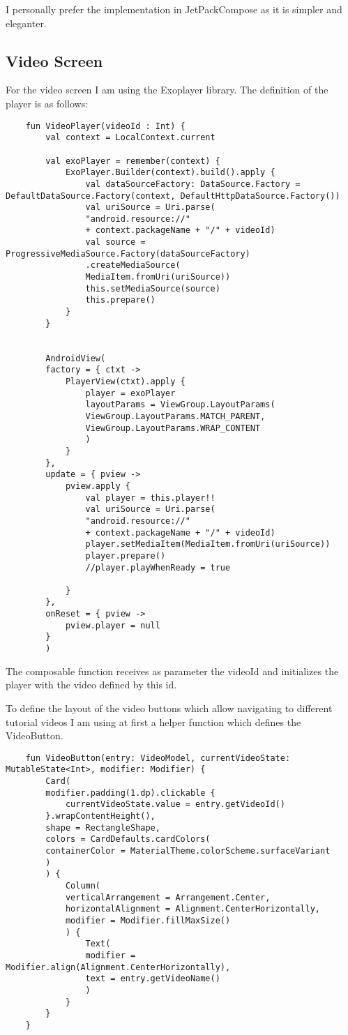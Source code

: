 I personally prefer the implementation in JetPackCompose as it is simpler and eleganter.

\subsection {Video Screen}

For the video screen I am using the Exoplayer library. The definition of the player is as follows:

\begin{lstlisting}
	fun VideoPlayer(videoId : Int) {
		val context = LocalContext.current
		
		val exoPlayer = remember(context) {
			ExoPlayer.Builder(context).build().apply {
				val dataSourceFactory: DataSource.Factory = DefaultDataSource.Factory(context, DefaultHttpDataSource.Factory())
				val uriSource = Uri.parse(
				"android.resource://"
				+ context.packageName + "/" + videoId)
				val source = ProgressiveMediaSource.Factory(dataSourceFactory)
				.createMediaSource(
				MediaItem.fromUri(uriSource))
				this.setMediaSource(source)
				this.prepare()
			}
		}
		
		
		AndroidView(
		factory = { ctxt ->
			PlayerView(ctxt).apply {
				player = exoPlayer
				layoutParams = ViewGroup.LayoutParams(
				ViewGroup.LayoutParams.MATCH_PARENT,
				ViewGroup.LayoutParams.WRAP_CONTENT
				)
			}
		},
		update = { pview ->
			pview.apply {
				val player = this.player!!
				val uriSource = Uri.parse(
				"android.resource://"
				+ context.packageName + "/" + videoId)
				player.setMediaItem(MediaItem.fromUri(uriSource))
				player.prepare()
				//player.playWhenReady = true
				
			}
		},
		onReset = { pview ->
			pview.player = null
		}
		)
\end{lstlisting}

The composable function receives as parameter the videoId and initializes the player with the video defined by this id. 

To define the layout of the video buttons which allow navigating to different tutorial videos I am using at first a helper function which defines the VideoButton.

\begin{lstlisting}
	fun VideoButton(entry: VideoModel, currentVideoState: MutableState<Int>, modifier: Modifier) {
		Card(
		modifier.padding(1.dp).clickable {
			currentVideoState.value = entry.getVideoId()
		}.wrapContentHeight(),
		shape = RectangleShape,
		colors = CardDefaults.cardColors(
		containerColor = MaterialTheme.colorScheme.surfaceVariant
		)
		) {
			Column(
			verticalArrangement = Arrangement.Center,
			horizontalAlignment = Alignment.CenterHorizontally,
			modifier = Modifier.fillMaxSize()
			) {
				Text(
				modifier = Modifier.align(Alignment.CenterHorizontally),
				text = entry.getVideoName()
				)
			}
		}
	}
\end{lstlisting}


